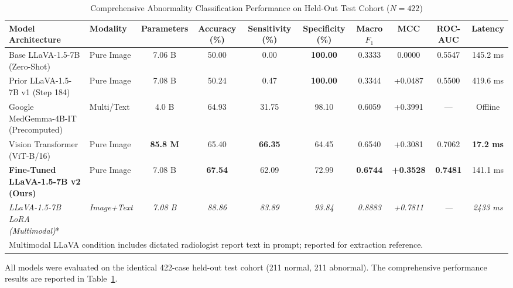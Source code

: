 \documentclass[conference]{IEEEtran}
\begin{document}
\begin{table}[t]
\centering
\caption{Comprehensive Abnormality Classification Performance on Held-Out Test Cohort ($N = 422$)}
\label{tab:benchmark_comparison}
\begin{tabular}{llcccccccc}
\toprule
\textbf{Model Architecture} & \textbf{Modality} & \textbf{Parameters} & \textbf{Accuracy (\%)} & \textbf{Sensitivity (\%)} & \textbf{Specificity (\%)} & \textbf{Macro $F_1$} & \textbf{MCC} & \textbf{ROC-AUC} & \textbf{Latency} \\
\midrule
Base LLaVA-1.5-7B (Zero-Shot) & Pure Image & 7.06 B & 50.00 & 0.00 & \textbf{100.00} & 0.3333 & 0.0000 & 0.5547 & 145.2 ms \\
Prior LLaVA-1.5-7B v1 (Step 184) & Pure Image & 7.08 B & 50.24 & 0.47 & \textbf{100.00} & 0.3344 & +0.0487 & 0.5500 & 419.6 ms \\
Google MedGemma-4B-IT (Precomputed) & Multi/Text & 4.0 B & 64.93 & 31.75 & 98.10 & 0.6059 & +0.3991 & --- & Offline \\
Vision Transformer (ViT-B/16) & Pure Image & \textbf{85.8 M} & 65.40 & \textbf{66.35} & 64.45 & 0.6540 & +0.3081 & 0.7062 & \textbf{17.2 ms} \\
\textbf{Fine-Tuned LLaVA-1.5-7B v2 (Ours)} & Pure Image & 7.08 B & \textbf{67.54} & 62.09 & 72.99 & \textbf{0.6744} & \textbf{+0.3528} & \textbf{0.7481} & 141.1 ms \\
\midrule
\textit{LLaVA-1.5-7B LoRA (Multimodal)}* & \textit{Image+Text} & \textit{7.08 B} & \textit{88.86} & \textit{83.89} & \textit{93.84} & \textit{0.8883} & \textit{+0.7811} & \textit{---} & \textit{2433 ms} \\
\bottomrule
\multicolumn{10}{l}{\footnotesize *Multimodal LLaVA condition includes dictated radiologist report text in prompt; reported for extraction reference.}
\end{tabular}
\end{table}

All models were evaluated on the identical 422-case held-out test cohort (211 normal, 211 abnormal). The comprehensive performance results are reported in Table~\ref{tab:benchmark_comparison}.
\end{document}
